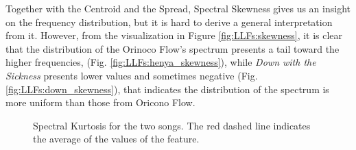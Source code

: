 Together with the Centroid and the Spread, Spectral Skewness gives us an insight on the frequency distribution, but it is hard to derive a general interpretation from it. However, from the visualization in Figure \ref{fig:LLFs:skewness}, it is clear that the distribution of the Orinoco Flow's spectrum presents a tail toward the higher frequencies, (Fig. \ref{fig:LLFs:henya_skewness}), while \textit{Down with the Sickness} presents lower values and sometimes negative (Fig. \ref{fig:LLFs:down_skewness}), that indicates the distribution of the spectrum is more uniform than those from Oricono Flow.

\begin{figure}[tb]
	\centering
	 \hfil
	\caption{Spectral Kurtosis for the two songs. The red dashed line indicates the average of the values of the feature.}
	\label{fig:LLFs:kurtosis}          
\end{figure}

